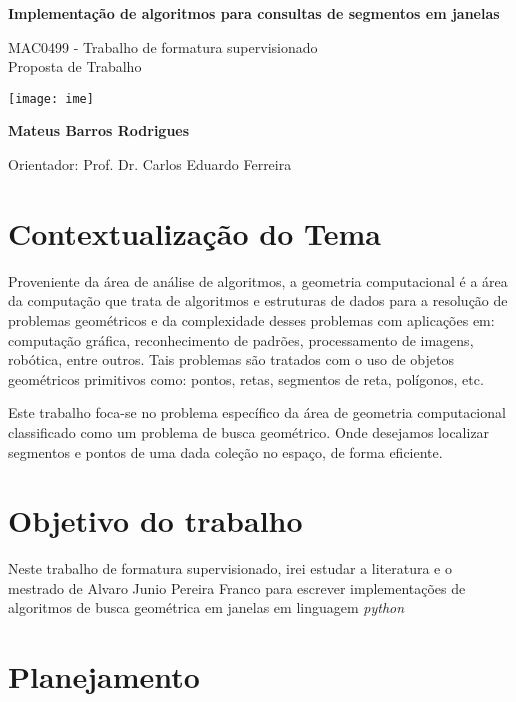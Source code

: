 \documentclass[10pt,twoside,a4paper]{article}
\begin{document}
\begin{center}
  \vspace*{3cm}
  
  \Huge
  \textbf{Implementação de algoritmos para consultas de segmentos em janelas}

  \vspace{2.5cm}
  \LARGE
  MAC0499 - Trabalho de formatura supervisionado\\
  \vspace{2.5cm}
  \LARGE
  Proposta de Trabalho

  
  \vspace{2cm}
  \texttt{[image: ime]}
  \vspace{2cm}
  
  \textbf{Mateus Barros Rodrigues}
  
  \vfill
  
  Orientador: Prof. Dr. Carlos Eduardo Ferreira
  
  \vspace{0.8cm}
  
  \Large
  
\end{center}




\newpage
\tableofcontents
\newpage
\section{Contextualização do Tema}
Proveniente da área de análise de algoritmos, a geometria computacional é a área da computação que trata de algoritmos e estruturas de dados para a resolução de problemas geométricos e da complexidade desses problemas com aplicações em: computação gráfica, reconhecimento de padrões, processamento de imagens, robótica, entre outros. Tais problemas são tratados com o uso de objetos geométricos primitivos como: pontos, retas, segmentos de reta, polígonos, etc.\par
Este trabalho foca-se no problema específico da área de geometria computacional classificado como um problema de busca geométrico. Onde desejamos localizar segmentos e pontos de uma dada coleção no espaço, de forma eficiente.


\section{Objetivo do trabalho}

Neste trabalho de formatura supervisionado, irei estudar a literatura e o mestrado de Alvaro Junio Pereira Franco \cite{alvaro} para escrever implementações de algoritmos de busca geométrica em janelas em linguagem \textit{python} 

\section{Planejamento}



\end{document}

